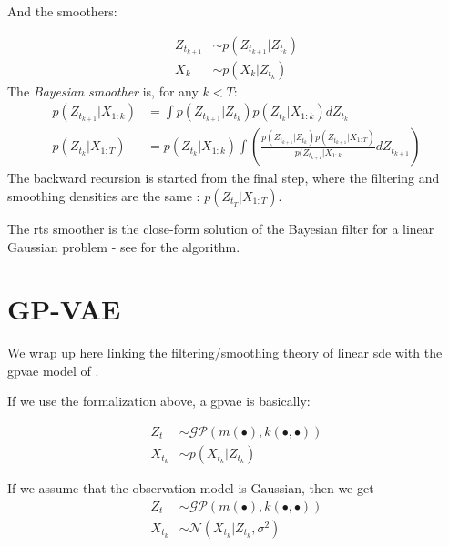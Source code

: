 And the smoothers:

\begin{tcolorbox}[colback=blue!5!white,colframe=black!75!black,title=Bayesian smoother]
    \begin{align}
        Z_{t_{k+1}} &\sim p(Z_{t_{k+1}} \vert Z_{t_k}) \\
        X_k &\sim p(X_k \vert Z_{t_k})
    \end{align}
    The \textit{Bayesian smoother} is, for any $k < T$:
    \begin{align}
        p(Z_{t_{k+1}} \vert X_{1:k}) &= \int p(Z_{t_{k+1}} \vert Z_{t_k}) p(Z_{t_k} \vert X_{1:k}) dZ_{t_k} \\
        p(Z_{t_k} \vert X_{1:T}) &= p(Z_{t_{k}} \vert X_{1:k})\int \left(
            \frac{
                p(Z_{t_{k+1}} \vert Z_{t_k}) p(Z_{t_{k+1}} \vert X_{1:T})
            }{
                p(Z_{t_{k+1}} \vert X_{1:k}
            }dZ_{t_{k+1}}
        \right)
    \end{align}
    The backward recursion is started from the final step, where the filtering and smoothing densities 
    are the same : $p(Z_{t_T} \vert X_{1:T})$.
\end{tcolorbox}

The \gls{rts} smoother is the close-form solution of the Bayesian filter for a linear Gaussian problem 
- see \cite{sarkka_applied_2019} for the algorithm.

\section{GP-VAE}

We wrap up here linking the filtering/smoothing theory of linear \gls{sde} with the \gls{gpvae} 
model of \cite{fortuin_gp-vae:_2020}.

If we use the formalization above, a \gls{gpvae} is basically:

\begin{align}
    \label{gpvae sde form}
    Z_t &\sim \mathcal{GP}(m(\bullet), k(\bullet, \bullet)) \\
    X_{t_k} &\sim p(X_{t_k} \vert Z_{t_k})
\end{align}

If we assume that the observation model is Gaussian, then we get
\begin{align}
    \label{gpvae gaussian observation}
    Z_t &\sim \mathcal{GP}(m(\bullet), k(\bullet, \bullet)) \\
    X_{t_k} &\sim \mathcal{N}(X_{t_k} \vert Z_{t_k}, \sigma^{2})
\end{align}

